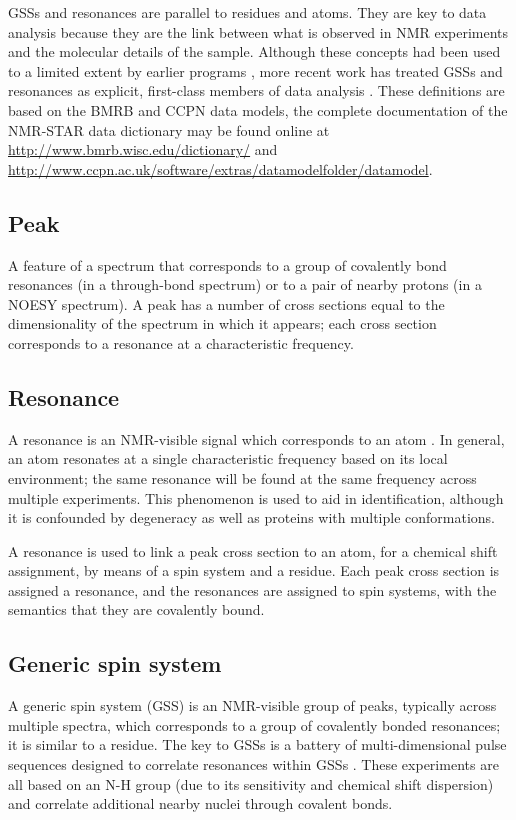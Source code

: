 GSSs \cite{saga, ezassign, pistachio, autoassign1997, autoassign2001}
and resonances \cite{ccpn} are parallel to residues and atoms.
They are key to data analysis because they are the link between what is 
observed in NMR experiments and the molecular details of the sample.
Although these concepts had been used to a limited extent by earlier programs
\cite{xeasy, sparky}, more recent work has treated GSSs and resonances as 
explicit, first-class members of data analysis \cite{ccpn, bmrb}.
These definitions are based on the BMRB and CCPN data models,
the complete documentation of the NMR-STAR data dictionary may be found online 
at \url{http://www.bmrb.wisc.edu/dictionary/} and
\url{http://www.ccpn.ac.uk/software/extras/datamodelfolder/datamodel}.

\subsection*{Peak}
A feature of a spectrum that corresponds to a group of covalently bond
resonances (in a through-bond spectrum) or to a pair of nearby protons
(in a NOESY spectrum).  A peak has a number of cross sections equal to
the dimensionality of the spectrum in which it appears; each cross section
corresponds to a resonance at a characteristic frequency.

\subsection*{Resonance}
A resonance is an NMR-visible signal which corresponds to an atom \cite{ccpn}.
In general, an atom resonates at a single characteristic frequency based
on its local environment;  the same resonance will be found at the same 
frequency across multiple experiments.  This phenomenon is used to aid in 
identification, although it is confounded by degeneracy as well as proteins
with multiple conformations.

A resonance is used to link a peak cross section to an atom, for a chemical shift
assignment, by means of a spin system and a residue.  Each peak cross section is
assigned a resonance, and the resonances are assigned to spin systems, with
the semantics that they are covalently bound.

\subsection*{Generic spin system}
A generic spin system (GSS) is an NMR-visible group of peaks, typically 
across multiple spectra, which corresponds to a group of covalently bonded 
resonances; it is similar to a residue.  
The key to GSSs is a battery of multi-dimensional pulse 
sequences designed to correlate resonances within GSSs 
\cite{cavanagh1995protein, hncacb, hnco, cbcaconh}.  These experiments are all
based on an N-H group (due to its sensitivity and chemical shift dispersion)
and correlate additional nearby nuclei through covalent bonds.


